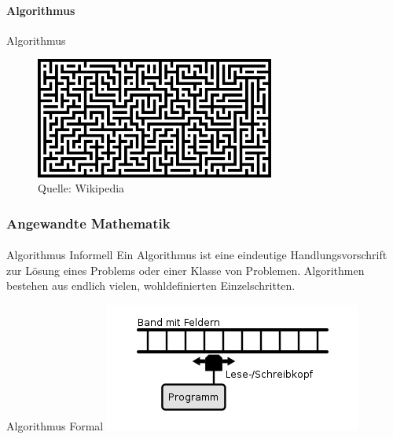 \documentclass{beamer}
\begin{document}
\begin{frame}
\framesubtitle{Algorithmus}
    \begin{block}{Algorithmus}
\begin{figure}[H]
      \centering
    \includegraphics[width=0.7\textwidth]{images/algo}
      \caption{Quelle: Wikipedia}
\end{figure}
\end{block}

 \end{frame}




\begin{frame}
    \frametitle{Angewandte Mathematik}
\framesubtitle{}
    \begin{block}{Algorithmus Informell}
Ein Algorithmus ist eine eindeutige Handlungsvorschrift zur Lösung eines Problems oder einer Klasse von Problemen. Algorithmen bestehen aus endlich vielen, wohldefinierten Einzelschritten.
\end{block}
    \begin{block}{Algorithmus Formal}
\includegraphics[scale=0.8]{images/Turingmaschine}
\end{block}
 \end{frame}
\end{document}
